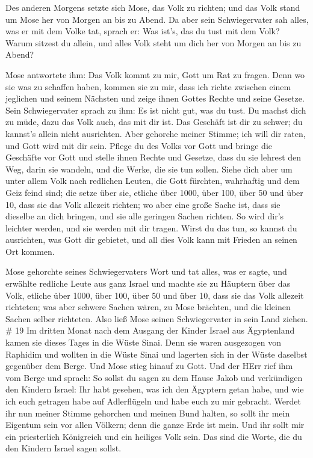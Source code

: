  Des anderen Morgens setzte sich Mose, das Volk zu richten;
und das Volk stand um Mose her von Morgen an bis zu Abend. 
Da aber sein Schwiegervater sah alles, was er mit dem Volke tat, sprach
er: Was ist's, das du tust mit dem Volk? Warum sitzest du allein, und
alles Volk steht um dich her von Morgen an bis zu Abend?

 Mose antwortete ihm: Das Volk kommt zu mir, Gott um Rat zu
fragen.  Denn wo sie was zu schaffen haben, kommen sie zu
mir, dass ich richte zwischen einem jeglichen und seinem Nächsten und
zeige ihnen Gottes Rechte und seine Gesetze.  Sein
Schwiegervater sprach zu ihm: Es ist nicht gut, was du tust.
 Du machst dich zu müde, dazu das Volk auch, das mit dir
ist. Das Geschäft ist dir zu schwer; du kannst's allein nicht
ausrichten.  Aber gehorche meiner Stimme; ich will dir
raten, und Gott wird mit dir sein. Pflege du des Volks vor Gott und
bringe die Geschäfte vor Gott  und stelle ihnen Rechte und
Gesetze, dass du sie lehrest den Weg, darin sie wandeln, und die Werke,
die sie tun sollen.  Siehe dich aber um unter allem Volk
nach redlichen Leuten, die Gott fürchten, wahrhaftig und dem Geiz feind
sind; die setze über sie, etliche über 1000, über 100, über 50 und über
10,  dass sie das Volk allezeit richten; wo aber eine große
Sache ist, dass sie dieselbe an dich bringen, und sie alle geringen
Sachen richten. So wird dir's leichter werden, und sie werden mit dir
tragen.  Wirst du das tun, so kannst du ausrichten, was
Gott dir gebietet, und all dies Volk kann mit Frieden an seinen Ort
kommen.

 Mose gehorchte seines Schwiegervaters Wort und tat alles,
was er sagte,  und erwählte redliche Leute aus ganz Israel
und machte sie zu Häuptern über das Volk, etliche über 1000, über 100,
über 50 und über 10,  dass sie das Volk allezeit richteten;
was aber schwere Sachen wären, zu Mose brächten, und die kleinen Sachen
selber richteten.  Also ließ Mose seinen Schwiegervater in
sein Land ziehen. \# 19  Im dritten Monat nach dem Ausgang
der Kinder Israel aus Ägyptenland kamen sie dieses Tages in die Wüste
Sinai.  Denn sie waren ausgezogen von Raphidim und wollten
in die Wüste Sinai und lagerten sich in der Wüste daselbst gegenüber dem
Berge.  Und Mose stieg hinauf zu Gott. Und der HErr rief ihm
vom Berge und sprach: So sollst du sagen zu dem Hause Jakob und
verkündigen den Kindern Israel:  Ihr habt gesehen, was ich
den Ägyptern getan habe, und wie ich euch getragen habe auf Adlerflügeln
und habe euch zu mir gebracht.  Werdet ihr nun meiner Stimme
gehorchen und meinen Bund halten, so sollt ihr mein Eigentum sein vor
allen Völkern; denn die ganze Erde ist mein.  Und ihr sollt
mir ein priesterlich Königreich und ein heiliges Volk sein. Das sind die
Worte, die du den Kindern Israel sagen sollst.

